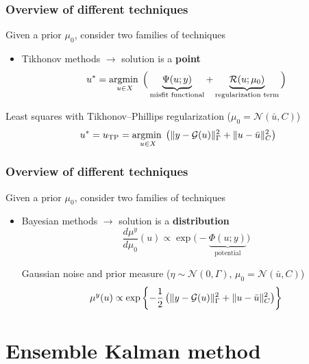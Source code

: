 \begin{frameT}
\frametitle{Overview of different techniques}
Given a prior $\mu_0$, consider two families of techniques
\vspace{0.5cm}
\begin{itemize}
\item Tikhonov methods $\longrightarrow$ solution is a \textbf{point}
\begin{equation*}
u^* = \operatorname*{\mathrm{argmin}\;}_{u \in X} \Big( \underbrace{\Psi(u;y)}_{\text{misfit functional}} + \underbrace{\mathcal{R}(u;\mu_0)}_{\text{regularization term}} \Big)
\end{equation*}
\end{itemize}
\begin{greenblock}[Example]
Least squares with Tikhonov--Phillips regularization ($\mu_0 = \mathcal{N}(\bar{u},C)$)
\begin{equation*}
u^* = u_{\mathrm{TP}} = \operatorname*{\mathrm{argmin}\;}_{u \in X} \left ( \lVert y - \mathcal{G}(u)\rVert_{\Gamma}^2 + \lVert u - \bar{u}\rVert_C^2 \right )
\end{equation*}
\end{greenblock}
\end{frameT}

\begin{frameT}
\frametitle{Overview of different techniques}
Given a prior $\mu_0$, consider two families of techniques
\vspace{0.5cm}
\begin{itemize}
\item Bayesian methods $\longrightarrow$ solution is a \textbf{distribution}
\begin{equation*}
\dfrac{d \mu^y}{d \mu_0}(u) \propto \exp \Big(- \underbrace{\Phi(u;y)}_{\text{potential}} \Big)
\end{equation*}
\begin{greenblock}[Example]
Gaussian noise and prior measure ($\eta \sim \mathcal{N}(0,\Gamma)$, $\mu_0 = \mathcal{N}(\bar{u},C)$)
\begin{equation*}
\mu^y(u) \propto \exp \left \{ - \frac{1}{2} \left ( \lVert y - \mathcal{G}(u)\rVert_{\Gamma}^2 + \lVert u - \bar{u}\rVert_C^2 \right ) \right \}
\end{equation*}
\end{greenblock}
\end{itemize}
\end{frameT}

\section{Ensemble Kalman method}

